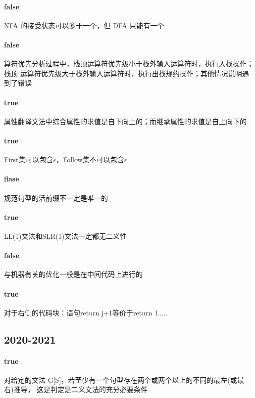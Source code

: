 \documentclass[UTF8]{ctexart} %
\begin{document}
\paragraph{false} NFA 的接受状态可以多于一个，但 DFA 只能有一个

\paragraph{false} 算符优先分析过程中，栈顶运算符优先级小于栈外输入运算符时，执行入栈操作；栈顶 运算符优先级大于栈外输入运算符时，执行出栈规约操作；其他情况说明遇到了错误

\paragraph{true} 属性翻译文法中综合属性的求值是自下向上的；而继承属性的求值是自上向下的

\paragraph{true} First集可以包含$\epsilon$，Follow集不可以包含$\epsilon$

\paragraph{flase} 规范句型的活前缀不一定是唯一的

\paragraph{true} LL(1)文法和SLR(1)文法一定都无二义性

\paragraph{false} 与机器有关的优化一般是在中间代码上进行的

\paragraph{true} 对于右侧的代码块：语句return j+1等价于return 1.....

\subsection{2020-2021}

\paragraph{true} 对给定的文法 G[S]，若至少有一个句型存在两个或两个以上的不同的最左(或最右)推导， 这是判定是二义文法的充分必要条件
\end{document}
